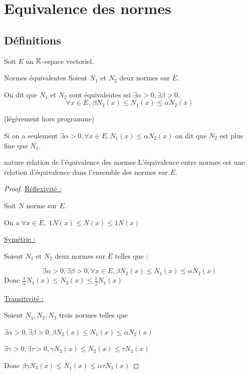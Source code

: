 \section{Equivalence des normes}

\subsection{Définitions}

Soit $E$ un $\mathbb{K}$-espace vectoriel. 

\begin{definition}{Normes équivalentes}{}
    Soient $N_1$ et $N_2$ deux normes sur $E$. 

    On dit que $N_1$ et $N_2$ sont équivalentes ssi $ \exists \alpha > 0, \exists \beta > 0, $
    $$\forall x \in E, \, \beta N_2(x) \leqslant N_1(x) \leqslant \alpha N_2(x)$$
\end{definition}

\begin{remarque}
    (légèrement hors programme)

    Si on a seulement $\exists \alpha > 0, \forall x \in E, N_1(x) \leqslant \alpha N_2(x)$
    on dit que $N_2$ est plus fine que $N_1$. 
\end{remarque}

\begin{proposition}{nature relation de l'équivalence des normes}{}
    L'équivalence entre normes est une relation d'équivalence dans l'ensemble des normes 
    sur $E$. 
\end{proposition}


\begin{proof}
    \quad \underline{Réflexivité :}

    Soit $N $ norme sur $E$. 

    On a $\forall x \in E, \; 1 N(x) \leqslant N(x) \leqslant 1N(x)$

    \quad \underline{Symétrie :}

    Soient $N_1$ et $N_2$ deux normes sur $E$ telles que : 

    $$ \exists \alpha > 0, \exists \beta > 0, \forall x \in E, \beta N_2(x) \leqslant N_1(x) \leqslant \alpha N_2(x)$$
    Donc $\frac 1 \alpha N_1(x) \leqslant N_2(x) \leqslant \frac 1 \beta N_1(x)$

    \quad \underline{Transitivité : }

    Soient $N_1, N_2, N_3$ trois normes telles que 

    $\exists \alpha > 0, \exists \beta >0 , \beta N_2(x) \leqslant N_1(x) \leqslant \alpha N_2(x)$

    $\exists \gamma > 0, \exists \tau > 0, \gamma N_3(x) \leqslant N_2(x) \leqslant \tau N_3(x)$

    Donc $\beta \gamma N_3(x) \leqslant N_1(x) \leqslant \alpha \tau N_3(x)$
\end{proof}

